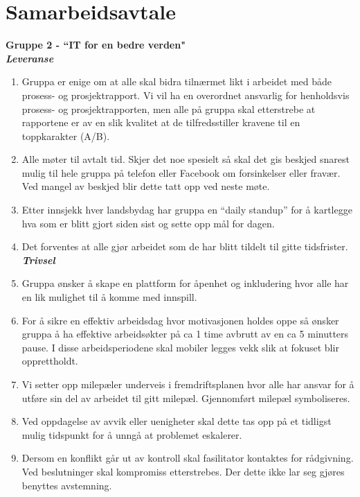 \section{Samarbeidsavtale}
\label{appendix:samarbeidsavtale}
\bf{Gruppe 2 - ``IT for en bedre verden"}\\

\bf{\textit{Leveranse}}
\begin{enumerate}
\item Gruppa er enige om at alle skal bidra tilnærmet likt i arbeidet med både prosess- og prosjektrapport. Vi vil ha en overordnet ansvarlig for henholdsvis prosess- og prosjektrapporten, men alle på gruppa skal etterstrebe at rapportene er av en slik kvalitet at de tilfredsstiller kravene til en toppkarakter (A/B).
\item Alle møter til avtalt tid. Skjer det noe spesielt så skal det gis beskjed snarest mulig til hele gruppa på telefon eller Facebook om forsinkelser eller fravær. Ved mangel av beskjed blir dette tatt opp ved neste møte.
\item Etter innsjekk hver landsbydag har gruppa en “daily standup” for å kartlegge hva som er blitt gjort siden sist og sette opp mål for dagen.
\item Det forventes at alle gjør arbeidet som de har blitt tildelt til gitte tidsfrister.\\


\bf{\textit{Trivsel}}

\item Gruppa ønsker å skape en plattform for åpenhet og inkludering hvor alle har en lik mulighet til å komme med innspill.
\item For å sikre en effektiv arbeidsdag hvor motivasjonen holdes oppe så ønsker gruppa å ha effektive arbeidsøkter på ca 1 time avbrutt av en ca 5 minutters pause. I disse arbeidsperiodene skal mobiler legges vekk slik at fokuset blir opprettholdt.
\item Vi setter opp milepæler underveis i fremdriftsplanen hvor alle har ansvar for å utføre sin del av arbeidet til gitt milepæl. Gjennomført milepæl symboliseres.
\item Ved oppdagelse av avvik eller uenigheter skal dette tas opp på et tidligst mulig tidspunkt for å unngå at problemet eskalerer.
\item Dersom en konflikt går ut av kontroll skal fasilitator kontaktes for rådgivning.
Ved beslutninger skal kompromiss etterstrebes. Der dette ikke lar seg gjøres benyttes avstemning.\\


\end{enumerate}
